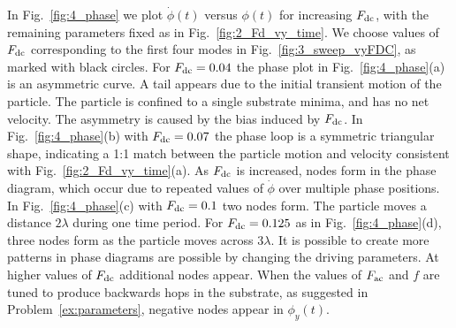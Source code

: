 \documentclass[preprint,showpacs,preprintnumbers,amsmath,amssymb,aps,prb]{revtex4-1}
\theoremstyle{remark}
\begin{document}
  In Fig.~\ref{fig:4_phase}
  we plot $\dot{\phi}(t)$ versus $\phi(t)$
  for increasing 
  $F_{\rm dc}$, 
  with the remaining parameters fixed as in Fig.~\ref{fig:2_Fd_vy_time}.
  We choose values of $F_{\rm dc}$
  corresponding to the first four modes in
  Fig.~\ref{fig:3_sweep_vyFDC},
  as marked with black circles.
  For
  $F_{\rm dc} = 0.04$
  the phase plot   in Fig.~\ref{fig:4_phase}(a)  is an
  asymmetric curve.
  A tail appears
  due to the initial transient
  motion of the particle.
  The particle is confined to a single
  substrate minima,
  and has no net velocity.
  The asymmetry is caused by the bias induced by $F_{\rm dc}$.
  In Fig.~\ref{fig:4_phase}(b)
  with $F_{\rm dc} = 0.07$
  the phase loop is a symmetric triangular shape,
  indicating a 1:1 match between the
  particle motion and velocity consistent with 
  Fig.~\ref{fig:2_Fd_vy_time}(a).
  As $F_{\rm dc}$ is
  increased,
  nodes form in the phase diagram, which occur
  due to repeated values
  of $\dot{\phi}$ over multiple phase positions.
  In Fig.~\ref{fig:4_phase}(c)
  with $F_{\rm dc} = 0.1$
  two nodes form.
  The particle moves a distance $2\lambda$
  during one time period.
For $F_{\rm dc} = 0.125$ as in Fig.~\ref{fig:4_phase}(d),
three nodes form as the particle moves across $3\lambda$.
It is possible to create
more patterns in phase diagrams are possible
by changing the driving parameters.
At higher values of $F_{\rm dc}$
additional nodes appear.
When the values of $F_{\rm ac}$ and $f$
are tuned to produce backwards hops in the substrate,
as suggested in Problem~\ref{ex:parameters}, 
negative nodes appear in $\phi_y(t)$.
  
\end{document}
